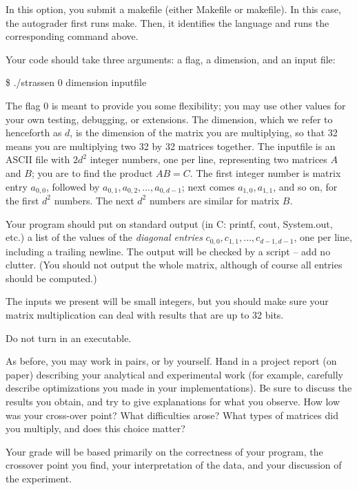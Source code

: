 \documentclass[11pt]{article}
\begin{document}
In this option, you submit a makefile (either Makefile or makefile). In this case, the autograder first runs make. Then, it identifies the language and runs the corresponding command above.

Your code should take three arguments: a flag, a dimension, and an input file:

\noindent \$ ./strassen 0 dimension inputfile 

The flag 0 is meant to provide you some flexibility; you may use other
values for your own testing, debugging, or extensions.  The dimension,
which we refer to henceforth as $d$, is the dimension of the matrix
you are multiplying, so that 32 means you are multiplying two 32 by 32
matrices together.  The inputfile is an ASCII file with $2d^2$ integer
numbers, one per line, representing two matrices $A$ and $B$; you are
to find the product $AB = C$.  The first integer number is matrix entry
$a_{0,0}$, followed by $a_{0,1},a_{0,2},\ldots,a_{0,d-1}$; next comes
$a_{1,0},a_{1,1}$, and so on, for the first $d^2$ numbers.  The next
$d^2$ numbers are similar for matrix $B$.

Your program should put on standard output (in C: printf, cout, System.out,
etc.) a list of the values of the {\em diagonal entries}
$c_{0,0},c_{1,1},\ldots,c_{d-1,d-1}$, one per line, including a
trailing newline.  The output will be checked by a script -- add no
clutter.  (You should not output the whole matrix, although of course
all entries should be computed.)

The inputs we present will be small integers, but you should make sure
your matrix multiplication can deal with results that are up to 32 bits.

Do not turn in an executable.


As before, you may work in pairs, or by yourself.  Hand in a project
report (on paper) describing your analytical and experimental work
(for example, carefully describe optimizations you made in your
implementations).  Be sure to discuss the results you obtain, and try
to give explanations for what you observe.  How low was your
cross-over point?  What difficulties arose?  What types of matrices did you
multiply, and does this choice matter?

Your grade will be based primarily on the correctness of your program,
the crossover point you find, your interpretation of the
data, and your discussion of the experiment.
\end{document}
